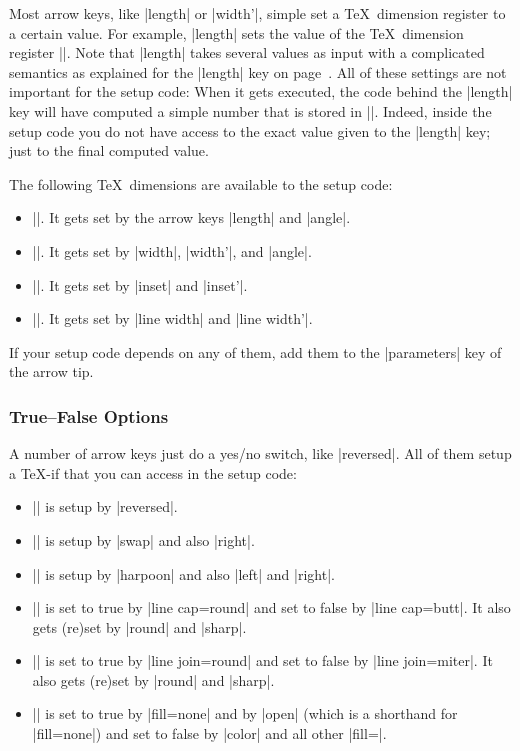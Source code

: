 Most arrow keys, like |length| or |width'|, simple set a \TeX\
dimension register to a certain value. For example, |length| sets the
value of the \TeX\ dimension register |\pgfarrowlength|. Note that
|length| takes several values as input with a complicated semantics as
explained for the |length| key on
page~\pageref{length-arrow-key}. All of these settings are not
important for the setup code: When it gets executed, the code behind
the |length| key will have computed a simple number that is stored
in |\pgfarrowlength|. Indeed, inside the setup code you do not have
access to the exact value given to the |length| key; just to the
final computed value.

The following \TeX\ dimensions are available to the setup code:

\begin{itemize}
\item |\pgfarrowslength|. It gets set by the arrow keys |length| and |angle|.
\item |\pgfarrowswidth|. It gets set by |width|, |width'|, and |angle|.
\item |\pgfarrowsinset|. It gets set by |inset| and |inset'|.
\item |\pgfarrowslinewidth|. It gets set by |line width| and |line width'|.
\end{itemize}

If your setup code depends on any of them, add them to the
|parameters| key of the arrow tip.


\subsubsection{True--False Options}

A number of arrow keys just do a yes/no switch, like |reversed|. All
of them setup a \TeX-if that you can access in the setup code:

\begin{itemize}
\item |\ifpgfarrowreversed| is setup by |reversed|.
\item |\ifpgfarrowswap| is setup by |swap| and also |right|.
\item |\ifpgfarrowharpoon| is setup by |harpoon| and also |left| and |right|.
\item |\ifpgfarrowroundcap| is set to true by |line cap=round| and set
  to false by |line cap=butt|. It also gets (re)set by  |round| and |sharp|.
\item |\ifpgfarrowroundjoin| is set to true by |line join=round| and set
  to false by |line join=miter|. It also gets (re)set by  |round| and |sharp|.
\item |\ifpgfarrowopen| is set to true by |fill=none| and by |open|
  (which is a shorthand for |fill=none|) and set to false by |color|
  and all other |fill=|\meta{color}.  
\end{itemize}

